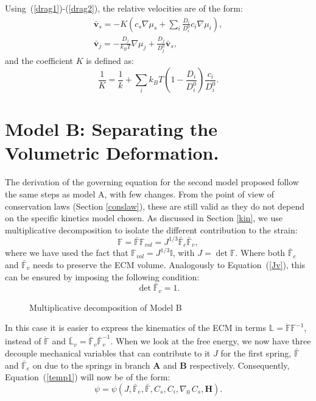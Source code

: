\documentclass[runningheads]{llncs}
\newcommand{\F}{\ensuremath{\mathbb{F}}}
\newcommand{\LL}{\ensuremath{\mathbb{L}}}
\begin{document}
Using~(\ref{drag1})-(\ref{drag2}), the relative velocities are of the form:
\begin{eqnarray}
\bar{\mathbf{v}}_s = -K \left(c_s\nabla \mu_s +\sum_i \frac{D_i}{D^0_i} c_i \nabla \mu_i\right),\\
\bar{\mathbf{v}}_j = - \frac{D_j}{k_B T}\nabla \mu_j + \frac{D_j}{D^0_j} \bar{\mathbf{v}}_s, 
\end{eqnarray}
and the coefficient $K$ is defined as:
\begin{equation}
\frac{1}{K} = \frac{1}{k} + \sum_i k_B T \left(1-\frac{D_i}{D^0_i}\right) \frac{c_i}{D^0_i}.
\end{equation}

\section{Model B: Separating the Volumetric Deformation.}
The derivation of the governing equation for the second model proposed follow the same steps as model A, with few changes. From the point of view of conservation laws (Section \ref{conslaw}), these are still valid as they do not depend on the specific kinetics model chosen. As discussed in Section \ref{kin}, we use multiplicative decomposition to isolate the different contribution to the strain:
\begin{equation}
\F= \bar{\F} \F_{vol}= J^{1/3} \bar{\F}_e \bar{\F}_v,\label{mol2}
\end{equation}
where we have used the fact that $\F_{vol}=J^{1/3}\mathbb{I}$, with $J=\det \F$. Where both $\bar{\F}_e$  and $\bar{\F}_v$ needs to preserve the ECM volume. Analogously to Equation~(\ref{Jv}), this can be ensured by imposing the following condition:
\begin{equation}
\det \bar{\F}_v = 1.
\end{equation}
\begin{figure}
	\Large
	\def\svgwidth{1\linewidth}
	
	\caption{Multiplicative decomposition of Model B}
\end{figure}

In this case it is easier to express the kinematics of the ECM in terms $\LL=\dot{\F}\F^{-1}$, instead of $\dot{\F}$ and $\bar{\LL}_v=\dot{\bar{\F}}_v\bar{\F}_v^{-1}$. When we look at the free energy, we now have three decouple mechanical variables that can contribute to it $J$ for the first spring, $\bar{\F}$ and $\bar{\F}_e$ on due to the springs in branch $\mathbf{A}$ and $\mathbf{B}$ respectively. Consequently, Equation~(\ref{temp1}) will now be of the form:
\begin{equation}
\psi = \psi (J,\bar{\F}_e, \bar{\F}, C_s, C_i, \nabla_0 \,C_s,\mathbf{H}).\label{aptemp1}
\end{equation}
\end{document}
